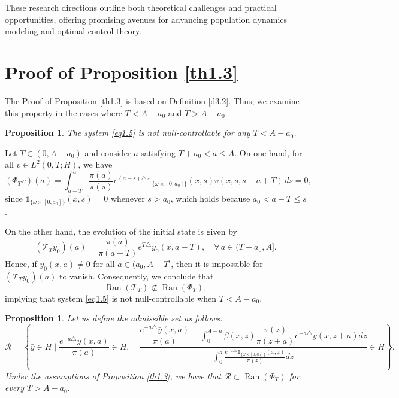 \documentclass[10pt, a4]{amsart}
\makeatletter
\newcounter{assu}
\theoremstyle{plain}
\newtheorem{proposition}[lemma]{Proposition}
\theoremstyle{definition}
\theoremstyle{remark}
\renewenvironment{proof}[1][\proofname]{\par
  \pushQED{\qed}%
  \normalfont \topsep6\p@\@plus6\p@\relax
  \trivlist
  \item[\hskip\labelsep
        \itshape
    #1\ \ref{#1}.]\ignorespaces
}{%
  \popQED\endtrivlist\@endpefalse
}
\numberwithin{equation}{section}
\makeatother
\begin{document}
These research directions outline both theoretical challenges and practical opportunities, offering promising avenues for advancing population dynamics modeling and optimal control theory.
\appendix
\section{Proof of Proposition \ref{th1.3}}\label{annexe:A}
The Proof of Proposition \ref{th1.3} is based on Definition \ref{d3.2}. Thus, we examine this property in the cases where \(T < A - a_0\) and \(T > A - a_0\).
\begin{proposition}\label{pr2.2}
The system \eqref{eq1.5} is not null-controllable for any  \(T < A-a_0\).
\end{proposition}

\begin{proof}[of Proposition \ref{pr2.2}]
Let \(T \in (0, A-a_0)\) and consider \(a\) satisfying \(T+a_0 < a \leq A\). On one hand, for all \(v \in L^2(0,T;H)\), we have
\[
(\Phi_T v)(a)= \int_{a-T}^{a}\frac{\pi(a)}{\pi(s)}e^{(a-s)\triangle}\mathds{1}_{\{\omega\times[0,a_0]\}}(x,s)v(x,s,s-a+T)\,ds = 0,
\]
since \(\mathds{1}_{\{\omega\times[0,a_0]\}}(x,s)=0\) whenever \(s > a_0\), which holds because \(a_0 < a-T \leq s\).

On the other hand, the evolution of the initial state is given by
\[
(\mathcal{T}_T y_0)(a)= \frac{\pi(a)}{\pi(a-T)}e^{T\triangle}y_{0}(x,a-T), \quad \forall\, a \in (T+a_0, A].
\]
Hence, if \(y_0(x,a) \neq 0\) for all \(a \in (a_0, A-T]\), then it is impossible for \((\mathcal{T}_T y_0)(a)\) to vanish. Consequently, we conclude that
\[
\operatorname{Ran} (\mathcal{T}_T) \not\subset \operatorname{Ran}(\Phi_T),
\]
implying that system \eqref{eq1.5} is not null-controllable when \(T < A-a_0\).
\end{proof}
\begin{proposition}\label{pr2.3}  
Let us define the admissible set as follows:  
\begin{equation*}
\mathcal{R}=\left\lbrace \bar{y}\in H \mid \dfrac{ e^{-a\triangle}\bar{y}(x,a)}{\pi(a)}\in H ,\quad \dfrac{\dfrac{e^{-a\triangle}\bar{y}(x,a)}{\pi(a) }-\displaystyle\int_{0}^{A-a}\beta(x,z)\dfrac{\pi(z)}{\pi(z+a)}e^{-a\triangle}\bar{y}(x,z+a)dz}{\displaystyle\int_{0}^{a}\frac{e^{-z\triangle}\mathds{1}_{\lbrace\omega\times[0,a_0]\rbrace}(x,z)}{\pi(z) }dz}\in H \right\rbrace.
\end{equation*}  
Under the assumptions of Proposition \ref{th1.3}, we have that \(\mathcal{R}\subset \operatorname{Ran}(\Phi_T)\) for every \(T > A - a_0\).
\end{proposition}
\end{document}
